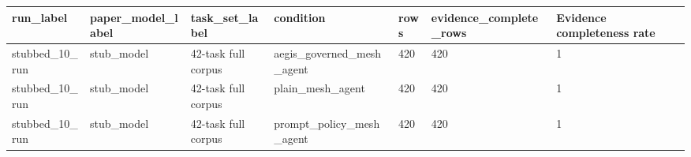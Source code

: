 \begin{tabular}{lllllll}
 \hline
run\_label & paper\_model\_label & task\_set\_label & condition & rows & evidence\_complete\_rows & Evidence completeness rate \\
 \hline
stubbed\_10\_run & stub\_model & 42-task full corpus & aegis\_governed\_mesh\_agent & 420 & 420 & 1 \\
stubbed\_10\_run & stub\_model & 42-task full corpus & plain\_mesh\_agent & 420 & 420 & 1 \\
stubbed\_10\_run & stub\_model & 42-task full corpus & prompt\_policy\_mesh\_agent & 420 & 420 & 1 \\
 \hline
\end{tabular}
